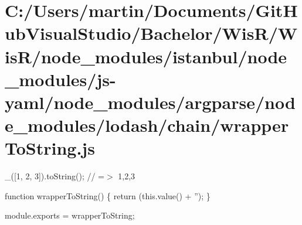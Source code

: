 \hypertarget{_c_1_2_users_2martin_2_documents_2_git_hub_visual_studio_2_bachelor_2_wis_r_2_wis_r_2node_module2017938a804ec221f7e1f325ebc9ba9f}{}\section{C\+:/\+Users/martin/\+Documents/\+Git\+Hub\+Visual\+Studio/\+Bachelor/\+Wis\+R/\+Wis\+R/node\+\_\+modules/istanbul/node\+\_\+modules/js-\/yaml/node\+\_\+modules/argparse/node\+\_\+modules/lodash/chain/wrapper\+To\+String.\+js}
\+\_\+(\mbox{[}1, 2, 3\mbox{]}).to\+String(); // =$>$ \textquotesingle{}1,2,3\textquotesingle{}


\begin{DoxyCodeInclude}

\textcolor{keyword}{function} wrapperToString() \{
  \textcolor{keywordflow}{return} (this.value() + \textcolor{stringliteral}{''});
\}

module.exports = wrapperToString;
\end{DoxyCodeInclude}
 